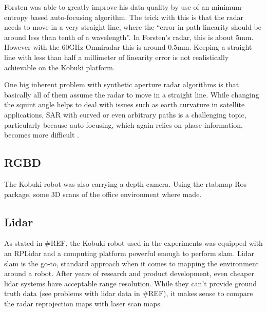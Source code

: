 Forsten was able to greatly
improve his data quality by use of an minimum-entropy based
auto-focusing algorithm. The trick with this is that the radar needs to
move in a very straight line, where the ``error in path linearity should
be around less than tenth of a wavelength''. In Forsten's radar, this is
about 5mm. However with the 60GHz Omniradar this is around 0.5mm.
Keeping a straight line with less than half a millimeter of linearity
error is not realistically achievable on the Kobuki platform.



One big inherent problem with synthetic aperture radar algorithms is
that basically all of them assume the radar to move in a straight line.
While changing the squint angle helps to deal with issues such as earth
curvature in satellite applications, SAR with curved or even arbitrary
paths is a challenging topic, particularly because auto-focusing, which
again relies on phase information, becomes more difficult
\cite{Axelsson2002}.

\subsection{RGBD}\label{rgbd-1}

The Kobuki robot was also carrying a depth camera. Using the rtabmap Ros
package, some 3D scans of the office environment where made.

\subsection{Lidar}\label{lidar-1}

As stated in \#REF, the Kobuki robot used in the experiments was
equipped with an RPLidar and a computing platform powerful enough to
perform slam. Lidar slam is the go-to, standard approach when it comes
to mapping the environment around a robot. After years of research and
product development, even cheaper lidar systems have acceptable range
resolution. While they can't provide ground truth data (see problems
with lidar data in \#REF), it makes sense to compare the radar
reprojection maps with laser scan maps.
